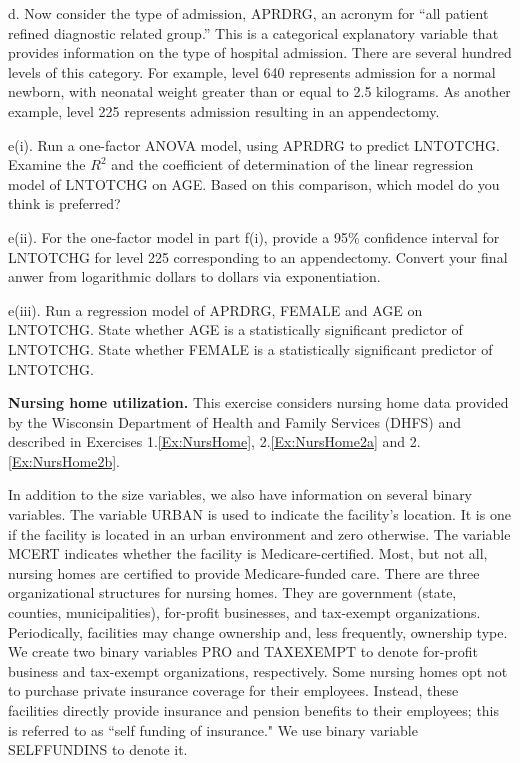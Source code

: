 \begin{exercises}
d. Now consider the type of admission, APRDRG, an acronym for ``all
patient refined diagnostic related group.'' This is a categorical
explanatory variable that provides information on the type of
hospital admission. There are several hundred levels of this
category. For example, level 640 represents admission for a normal
newborn, with neonatal weight greater than or equal to 2.5
kilograms. As another example, level 225 represents admission
resulting in an appendectomy.

e(i). Run a one-factor ANOVA model, using APRDRG to predict
LNTOTCHG. Examine the $R^{2}$ and the coefficient of determination
of the linear regression model of LNTOTCHG on AGE. Based on this
comparison, which model do you think is preferred?

e(ii). For the one-factor model in part f(i), provide a 95\%
confidence interval for LNTOTCHG for level 225 corresponding to an
appendectomy. Convert your final anwer from logarithmic dollars to
dollars via exponentiation.

e(iii). Run a regression model of APRDRG, FEMALE and AGE on
LNTOTCHG. State whether AGE is a statistically significant predictor
of LNTOTCHG. State whether FEMALE is a statistically significant
predictor of LNTOTCHG.


\item \textbf{Nursing home utilization.}\label{Ex:NursHome4} This exercise considers nursing
home data provided by the Wisconsin Department of Health and Family
Services (DHFS) and described in Exercises 1.\ref{Ex:NursHome},
2.\ref{Ex:NursHome2a} and 2.\ref{Ex:NursHome2b}.

In addition to the size variables, we also have information on
several binary variables. The variable URBAN is used to indicate the
facility's location. It is one if the facility is located in an
urban environment and zero otherwise. The variable MCERT indicates
whether the facility is Medicare-certified. Most, but not all,
nursing homes are certified to provide Medicare-funded care. There
are three organizational structures for nursing homes. They are
government (state, counties, municipalities), for-profit businesses,
and tax-exempt organizations. Periodically, facilities may change
ownership and, less frequently, ownership type. We create two binary
variables PRO and TAXEXEMPT to denote for-profit business and
tax-exempt organizations, respectively. Some nursing homes opt not
to purchase private insurance coverage for their employees. Instead,
these facilities directly provide insurance and pension benefits to
their employees; this is referred to as ``self funding of
insurance." We use binary variable SELFFUNDINS to denote it.


\end{exercises}
